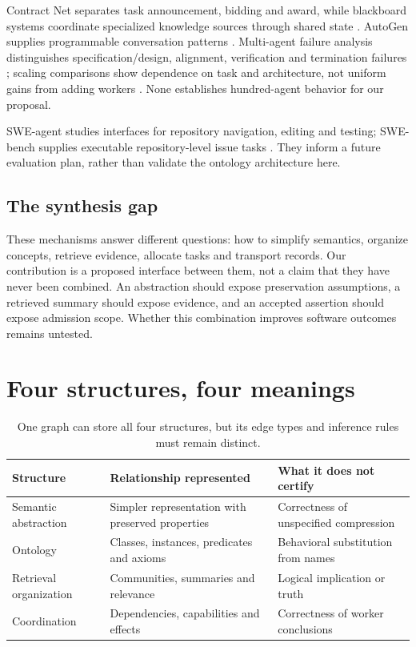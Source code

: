 \documentclass[11pt]{article}
\begin{document}
Contract Net separates task announcement, bidding and award, while blackboard systems coordinate specialized knowledge sources through shared state \citep{smith1980,nii1986}. AutoGen supplies programmable conversation patterns \citep{autogen2023}. Multi-agent failure analysis distinguishes specification/design, alignment, verification and termination failures \citep{mast2025}; scaling comparisons show dependence on task and architecture, not uniform gains from adding workers \citep{scaling2025}. None establishes hundred-agent behavior for our proposal.

SWE-agent studies interfaces for repository navigation, editing and testing; SWE-bench supplies executable repository-level issue tasks \citep{sweagent2024,swebench2024}. They inform a future evaluation plan, rather than validate the ontology architecture here.

\subsection{The synthesis gap}
These mechanisms answer different questions: how to simplify semantics, organize concepts, retrieve evidence, allocate tasks and transport records. Our contribution is a proposed interface between them, not a claim that they have never been combined. An abstraction should expose preservation assumptions, a retrieved summary should expose evidence, and an accepted assertion should expose admission scope. Whether this combination improves software outcomes remains untested.

\section{Four structures, four meanings}
\begin{table}[ht]\small\centering
\begin{tabularx}{\linewidth}{@{}lXX@{}}\toprule
Structure & Relationship represented & What it does not certify \\\midrule
Semantic abstraction & Simpler representation with preserved properties & Correctness of unspecified compression \\
Ontology & Classes, instances, predicates and axioms & Behavioral substitution from names \\
Retrieval organization & Communities, summaries and relevance & Logical implication or truth \\
Coordination & Dependencies, capabilities and effects & Correctness of worker conclusions \\\bottomrule
\end{tabularx}\caption{One graph can store all four structures, but its edge types and inference rules must remain distinct.}\end{table}
\end{document}
